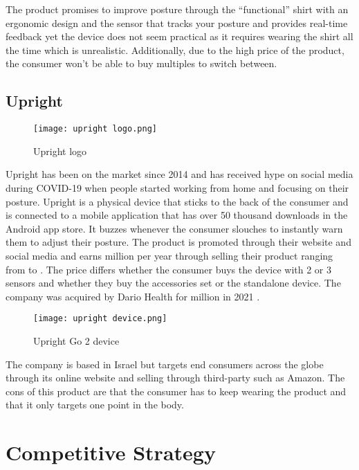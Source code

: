 \documentclass{article}
\begin{document}
The product promises to improve posture through the “functional” shirt with an ergonomic design and the sensor that tracks your posture and provides real-time feedback yet the device does not seem practical as it requires wearing the shirt all the time which is unrealistic. Additionally, due to the high price of the product, the consumer won’t be able to buy multiples to switch between.

\subsection*{Upright}

\begin{figure}[h!]
    \centering
    \texttt{[image: upright logo.png]}
    \caption{Upright logo}
    \label{fig:enter-label}
\end{figure}

Upright has been on the market since 2014 \cite{uprightpose} and has received hype on social media during COVID-19 when people started working from home and focusing on their posture. Upright is a physical device that sticks to the back of the consumer and is connected to a mobile application that has over 50 thousand downloads in the Android app store. It buzzes whenever the consumer slouches to instantly warn them to adjust their posture. The product is promoted through their website and social media and earns  million per year through selling their product \cite{upright_growjo} ranging from  to . The price differs whether the consumer buys the device with 2 or 3 sensors and whether they buy the accessories set or the standalone device. The company was acquired by Dario Health for  million in 2021 \cite{dariohealth_acquisition}. 

\begin{figure}[h!]
    \centering
    \texttt{[image: upright device.png]}
    \caption{Upright Go 2 device}
    \label{fig:enter-label}
\end{figure}

The company is based in Israel but targets end consumers across the globe through its online website and selling through third-party such as Amazon. The cons of this product are that the consumer has to keep wearing the product and that it only targets one point in the body.

\section*{Competitive Strategy}
\end{document}
